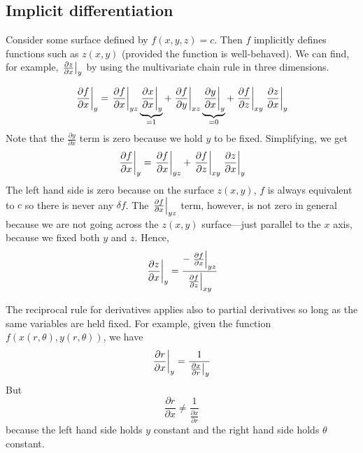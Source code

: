 \subsection{Implicit differentiation}
Consider some surface defined by \(f(x, y, z) = c\).
Then \(f\) implicitly defines functions such as \(z(x, y)\) (provided the function is well-behaved).
We can find, for example, \(\eval{\frac{\partial z}{\partial x}}_y\) by using the multivariate chain rule in three dimensions.

\[
	\eval{\frac{\partial f}{\partial x}}_y =
	\eval{\frac{\partial f}{\partial x}}_{yz} \underbrace{\eval{\frac{\partial x}{\partial x}}_{y}}_{\mathclap{=1}} +
	\eval{\frac{\partial f}{\partial y}}_{xz} \underbrace{\eval{\frac{\partial y}{\partial x}}_{y}}_{\mathclap{=0}} +
	\eval{\frac{\partial f}{\partial z}}_{xy} \eval{\frac{\partial z}{\partial x}}_{y}
\]
Note that the \(\frac{\partial y}{\partial x}\) term is zero because we hold \(y\) to be fixed.
Simplifying, we get
\[
	\eval{\frac{\partial f}{\partial x}}_y =
	\eval{\frac{\partial f}{\partial x}}_{yz} +
	\eval{\frac{\partial f}{\partial z}}_{xy} \eval{\frac{\partial z}{\partial x}}_{y}
\]
The left hand side is zero because on the surface \(z(x, y)\), \(f\) is always equivalent to \(c\) so there is never any \(\delta f\).
The \(\eval{\frac{\partial f}{\partial x}}_{yz}\) term, however, is not zero in general because we are not going across the \(z(x, y)\) surface---just parallel to the \(x\) axis, because we fixed both \(y\) and \(z\).
Hence,
\[
	\eval{\frac{\partial z}{\partial x}}_y = \frac{-\eval{\frac{\partial f}{\partial x}}_{yz}}{\eval{\frac{\partial f}{\partial z}}_{xy}}
\]

The reciprocal rule for derivatives applies also to partial derivatives so long as the same variables are held fixed.
For example, given the function \(f(x(r, \theta), y(r, \theta))\), we have
\[
	\eval{\frac{\partial r}{\partial x}}_y = \frac{1}{\eval{\frac{\partial x}{\partial r}}_y}
\]
But
\[
	\frac{\partial r}{\partial x} \neq \frac{1}{\frac{\partial x}{\partial r}}
\]
because the left hand side holds \(y\) constant and the right hand side holds \(\theta\) constant.

